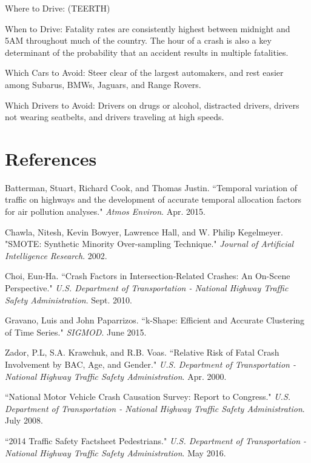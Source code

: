 \documentclass[11pt, oneside,titlepage]{article}   	%
\begin{document}
Where to Drive: (TEERTH)

When to Drive: Fatality rates are consistently highest between midnight and 5AM throughout much of the country. The hour of a crash is also a key determinant of the probability that an accident results in multiple fatalities.

Which Cars to Avoid: Steer clear of the largest automakers, and rest easier among Subarus, BMWs, Jaguars, and Range Rovers.

Which Drivers to Avoid: Drivers on drugs or alcohol, distracted drivers, drivers not wearing seatbelts, and drivers traveling at high speeds.


\section*{References}
\begin{hangparas}{1.27cm}{1}
Batterman, Stuart, Richard Cook, and Thomas Justin. ``Temporal variation of traffic on highways and the development of accurate temporal allocation factors for air pollution analyses." \textit{Atmos Environ}. Apr. 2015.

Chawla, Nitesh, Kevin Bowyer, Lawrence Hall, and W. Philip Kegelmeyer. "SMOTE: Synthetic Minority Over-sampling Technique." \textit{Journal of Artificial Intelligence Research}. 2002.

Choi, Eun-Ha. ``Crash Factors in Intersection-Related Crashes: An On-Scene Perspective." \textit{U.S. Department of Transportation - National Highway Traffic Safety Administration}. Sept. 2010.

Gravano, Luis and John Paparrizos. ``k-Shape: Efficient and Accurate Clustering of Time Series." \textit{SIGMOD}. June 2015.

Zador, P.L, S.A. Krawchuk, and R.B. Voas. ``Relative Risk of Fatal Crash Involvement by BAC, Age, and Gender." \textit{U.S. Department of Transportation - National Highway Traffic Safety Administration}. Apr. 2000.

``National Motor Vehicle Crash Causation Survey: Report to Congress." \textit{U.S. Department of Transportation - National Highway Traffic Safety Administration}. July 2008.

``2014 Traffic Safety Factsheet Pedestrians." \textit{U.S. Department of Transportation - National Highway Traffic Safety Administration}. May 2016.

\end{hangparas}
\end{document}
